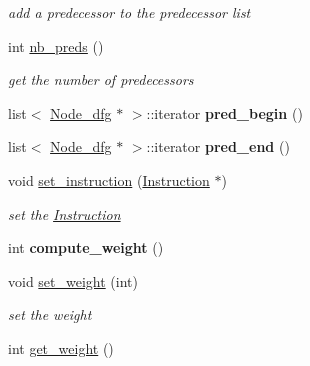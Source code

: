 \begin{DoxyCompactItemize}
\begin{DoxyCompactList}\small\item\em add a predecessor to the predecessor list \end{DoxyCompactList}\item 
\hypertarget{class_node__dfg_adef5e6e3362133f6adb38d404c8d8cf6}{int \hyperlink{class_node__dfg_adef5e6e3362133f6adb38d404c8d8cf6}{nb\+\_\+preds} ()}\label{class_node__dfg_adef5e6e3362133f6adb38d404c8d8cf6}

\begin{DoxyCompactList}\small\item\em get the number of predecessors \end{DoxyCompactList}\item 
\hypertarget{class_node__dfg_a769af0d7836679d6ee9abcc55d399887}{list$<$ \hyperlink{class_node__dfg}{Node\+\_\+dfg} $\ast$ $>$\+::iterator {\bfseries pred\+\_\+begin} ()}\label{class_node__dfg_a769af0d7836679d6ee9abcc55d399887}

\item 
\hypertarget{class_node__dfg_a86fc141e0697ae944900625212579957}{list$<$ \hyperlink{class_node__dfg}{Node\+\_\+dfg} $\ast$ $>$\+::iterator {\bfseries pred\+\_\+end} ()}\label{class_node__dfg_a86fc141e0697ae944900625212579957}

\item 
\hypertarget{class_node__dfg_a83747917d9c87b11633779731bcda162}{void \hyperlink{class_node__dfg_a83747917d9c87b11633779731bcda162}{set\+\_\+instruction} (\hyperlink{class_instruction}{Instruction} $\ast$)}\label{class_node__dfg_a83747917d9c87b11633779731bcda162}

\begin{DoxyCompactList}\small\item\em set the \hyperlink{class_instruction}{Instruction} \end{DoxyCompactList}\item 
\hypertarget{class_node__dfg_a395b778a0b23ae2bcfd6081d84661239}{int {\bfseries compute\+\_\+weight} ()}\label{class_node__dfg_a395b778a0b23ae2bcfd6081d84661239}

\item 
\hypertarget{class_node__dfg_af23f48b1521a90178cc5c9a59da3ab3c}{void \hyperlink{class_node__dfg_af23f48b1521a90178cc5c9a59da3ab3c}{set\+\_\+weight} (int)}\label{class_node__dfg_af23f48b1521a90178cc5c9a59da3ab3c}

\begin{DoxyCompactList}\small\item\em set the weight \end{DoxyCompactList}\item 
\hypertarget{class_node__dfg_a561e80f51cb9a71b22f22e8d2e6685de}{int \hyperlink{class_node__dfg_a561e80f51cb9a71b22f22e8d2e6685de}{get\+\_\+weight} ()}\label{class_node__dfg_a561e80f51cb9a71b22f22e8d2e6685de}


\end{DoxyCompactItemize}
